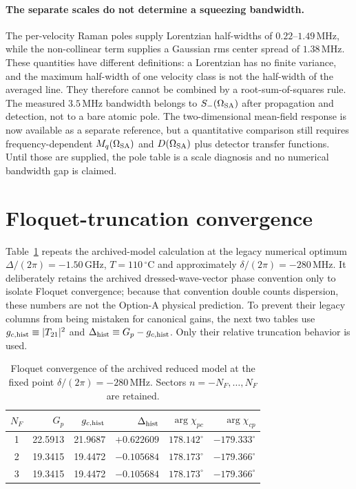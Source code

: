 \documentclass[11pt,a4paper]{article}
\newcommand{\GHz}{\,\mathrm{GHz}}
\newcommand{\MHz}{\,\mathrm{MHz}}
\newcommand{\degC}{\,^{\circ}\mathrm C}
\begin{document}
\paragraph{The separate scales do not determine a squeezing bandwidth.}
The per-velocity Raman poles supply Lorentzian half-widths of
$0.22$--$1.49\MHz$, while the non-collinear term supplies a Gaussian rms center
spread of $1.38\MHz$. These quantities have different definitions: a
Lorentzian has no finite variance, and the maximum half-width of one velocity
class is not the half-width of the averaged line. They therefore cannot be
combined by a root-sum-of-squares rule. The measured
$3.5\MHz$ bandwidth belongs to $S_-(\Omega_{\rm SA})$ after propagation and
detection, not to a bare atomic pole. The two-dimensional mean-field response
is now available as a separate reference, but a quantitative comparison still
requires frequency-dependent $M_q(\Omega_{\rm SA})$ and
$D(\Omega_{\rm SA})$ plus detector transfer functions. Until those are
supplied, the pole table is a scale diagnosis and no numerical bandwidth gap
is claimed.

\section{Floquet-truncation convergence}
\label{sec:floquet-convergence}

Table~\ref{tab:floquet-convergence} repeats the archived-model calculation at
the legacy numerical optimum
$\Delta/(2\pi)=-1.50\GHz$, $T=110\degC$ and approximately
$\delta/(2\pi)=-280\MHz$. It deliberately retains the archived
dressed-wave-vector phase convention only to isolate Floquet convergence;
because that convention double counts dispersion, these numbers are not the
Option-A physical prediction. To prevent their legacy columns from being
mistaken for canonical gains, the next two tables use
$g_{c,{\rm hist}}\equiv|T_{21}|^2$ and
$\Delta_{\rm hist}\equiv G_p-g_{c,{\rm hist}}$. Only
their relative truncation behavior is used.

\begin{table}[ht]
\centering
\caption{Floquet convergence of the archived reduced model at the fixed point
$\delta/(2\pi)=-280\MHz$. Sectors $n=-N_F,\ldots,N_F$ are retained.}
\label{tab:floquet-convergence}
\small
\begin{tabular}{c r r r r r}
\toprule
$N_F$ & $G_p$ & $g_{c,{\rm hist}}$ & $\Delta_{\rm hist}$ &
$\arg\chi_{pc}$ & $\arg\chi_{cp}$\\
\midrule
1 & 22.5913 & 21.9687 & $+0.622609$ &
$178.142^\circ$ & $-179.333^\circ$\\
2 & 19.3415 & 19.4472 & $-0.105684$ &
$178.173^\circ$ & $-179.366^\circ$\\
3 & 19.3415 & 19.4472 & $-0.105684$ &
$178.173^\circ$ & $-179.366^\circ$\\
\bottomrule
\end{tabular}
\end{table}
\end{document}
